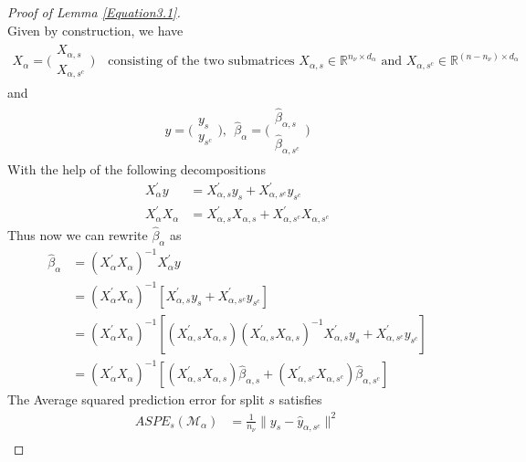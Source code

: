 \documentclass[Research_Module_ES.tex]{subfiles}
\begin{document}
\begin{proof}[Proof of Lemma \ref{Equation3.1}]~\\
	Given by construction, we have
	\begin{align*}
	X_\alpha=\Big(\begin{matrix}
	X_{\alpha,s}\\ X_{\alpha,s^c}
	\end{matrix}\Big)
	\text{~~~consisting of the two submatrices~} X_{\alpha,s}\in\mathbb{R}^{n_\nu\times d_\alpha} \text{~and~} X_{\alpha,s^c}\in\mathbb{R}^{(n-n_\nu)\times d_\alpha}
	\end{align*}
	and 
	\begin{align*}
	y=\Big(\begin{matrix}
	y_{s}\\ y_{s^c}
	\end{matrix}\Big),~~\hat{\beta}_\alpha=\Big(\begin{matrix}
	\hat{\beta}_{\alpha,s}\\ \hat{\beta}_{\alpha,s^c}
	\end{matrix}\Big)
	\end{align*}
	With the help of the following decompositions
	\begin{align*}
	X_\alpha^\prime y&=X_{\alpha,s}^\prime y_s+X_{\alpha,s^c}^\prime y_{s^c}\\
	X_\alpha^\prime X_\alpha&=X_{\alpha,s}^\prime X_{\alpha,s}+X_{\alpha,s^c}^\prime X_{\alpha,s^c}
	\end{align*}
	Thus now we can rewrite $\hat{\beta}_\alpha$ as
	\begin{align}
	\hat{\beta}_\alpha&=(X_\alpha^\prime X_\alpha)^{-1}X_\alpha^\prime y   \nonumber\\
	&=(X_\alpha^\prime X_\alpha)^{-1}[X_{\alpha,s}^\prime y_s+X_{\alpha,s^c}^\prime y_{s^c}]  \nonumber \\
	&=(X_\alpha^\prime X_\alpha)^{-1}[(X_{\alpha,s}^\prime X_{\alpha,s})(X_{\alpha,s}^\prime X_{\alpha,s})^{-1}X_{\alpha,s}^\prime y_s+X_{\alpha,s^c}^\prime y_{s^c}]  \nonumber \\
	&=(X_\alpha^\prime X_\alpha)^{-1}[(X_{\alpha,s}^\prime X_{\alpha,s}) \hat{\beta}_{\alpha,s}+(X_{\alpha,s^c}^\prime X_{\alpha,s^c})\hat{\beta}_{\alpha,s^c}]
	\label{beta_alpha_hat_decomposition}
	\end{align}
	The Average squared prediction error for split $s$ satisfies
	\begin{align*}
	ASPE_{s}(\mathcal{M}_\alpha)&=\frac{1}{n_\nu}\parallel y_s-\hat{y}_{\alpha,s^c}\parallel^2\\

\end{align*}
\end{proof}
\end{document}
